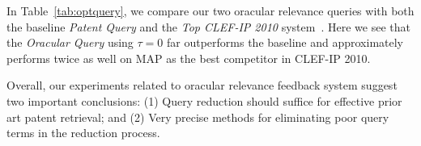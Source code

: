 In Table~\ref{tab:optquery}, we compare our two oracular relevance
queries with both the baseline \emph{Patent Query} and the \emph{Top
CLEF-IP 2010} system~\cite{lopez2010experiments}.  Here we see that
the {\em Oracular Query} using $\tau=0$ far outperforms the baseline and
approximately performs twice as well on MAP as the best competitor in
CLEF-IP 2010.

%
%


Overall, our experiments related to oracular relevance feedback system
suggest two important conclusions: (1) Query reduction should suffice for effective prior art patent retrieval; and (2) Very precise methods for eliminating poor query terms in the reduction process.


